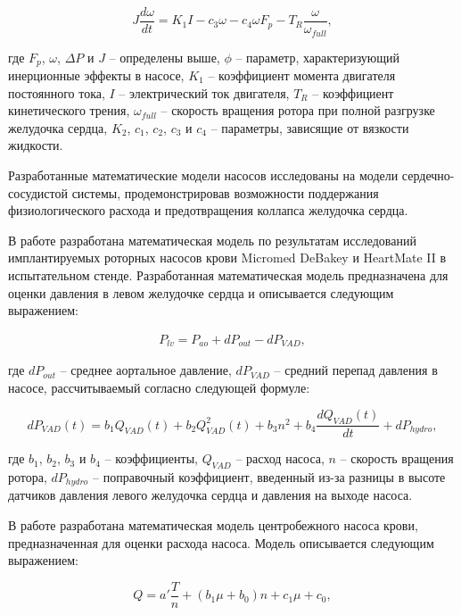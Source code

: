 \begin{equation}
	J\frac{d\omega}{dt} = K_1I - c_3\omega - c_4\omega F_p - T_R \frac{\omega}{\omega_{full}},
	\label{eq:wang_equation_2_speed}
\end{equation}

\noindent где $F_p$, $\omega$, $\Delta P$ и $J$ -- определены выше, $\phi$ -- параметр, характеризующий инерционные эффекты в насосе, $K_1$ -- коэффициент момента двигателя постоянного тока, $I$ -- электрический ток двигателя, $T_R$ -- коэффициент кинетического трения, $\omega_{full}$ -- скорость вращения ротора при полной разгрузке желудочка сердца, $K_2$, $c_1$, $c_2$, $c_3$ и $c_4$ -- параметры, зависящие от вязкости жидкости. 

Разработанные математические модели насосов исследованы на модели сердечно-сосудистой системы, продемонстрировав возможности поддержания физиологического расхода и предотвращения коллапса желудочка сердца.

В работе \cite{pennings2015estimation} разработана математическая модель по результатам исследований имплантируемых роторных насосов крови Micromed DeBakey и HeartMate II в испытательном стенде. Разработанная математическая модель предназначена для оценки давления в левом желудочке сердца и описывается следующим выражением:

\begin{eqnarray}
	P_{lv} = P_{ao} + dP_{out} - dP_{VAD},
	\label{eq:lv_pressure_estimation_pennings}
\end{eqnarray}

\noindent где $dP_{out}$ -- среднее аортальное давление, $dP_{VAD}$ -- средний перепад давления в насосе, рассчитываемый согласно следующей формуле:

\begin{equation}
	dP_{VAD}(t) = b_1Q_{VAD}(t) + b_2Q_{VAD}^{2}(t) + b_3n^2 + b_4\frac{dQ_{VAD}(t)}{dt} + dP_{hydro},
\end{equation}

\noindent где $b_1$, $b_2$, $b_3$ и $b_4$ -- коэффициенты, $Q_{VAD}$ -- расход насоса, $n$ -- скорость вращения ротора, $dP_{hydro}$ -- поправочный коэффициент, введенный из-за разницы в высоте датчиков давления левого желудочка сердца и давления на выходе насоса.

В работе \cite{hijikata2015estimating} разработана математическая модель центробежного насоса крови, предназначенная для оценки расхода насоса. Модель описывается следующим выражением:  

\begin{equation}
	Q = a'\frac{T}{n} + (b_1\mu + b_0)n + c_1\mu + c_0,
	\label{eq:hijikata_equation}
\end{equation}

